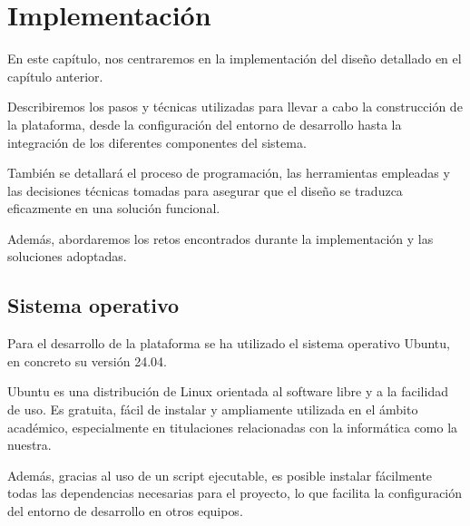 \chapter{Implementación}

En este capítulo, nos centraremos en la implementación del diseño detallado en el capítulo anterior. 

Describiremos los pasos y técnicas utilizadas para llevar a cabo la construcción de la plataforma, desde la configuración del entorno de desarrollo hasta la integración de los diferentes componentes del sistema. 

También se detallará el proceso de programación, las herramientas empleadas y las decisiones técnicas tomadas para asegurar que el diseño se traduzca eficazmente en una solución funcional. 

Además, abordaremos los retos encontrados durante la implementación y las soluciones adoptadas.




\newpage

\section{Sistema operativo}

Para el desarrollo de la plataforma se ha utilizado el sistema operativo Ubuntu, en concreto su versión 24.04.

Ubuntu es una distribución de Linux orientada al software libre y a la facilidad de uso. Es gratuita, fácil de instalar y ampliamente utilizada en el ámbito académico, especialmente en titulaciones relacionadas con la informática como la nuestra.

Además, gracias al uso de un script ejecutable, es posible instalar fácilmente todas las dependencias necesarias para el proyecto, lo que facilita la configuración del entorno de desarrollo en otros equipos.

